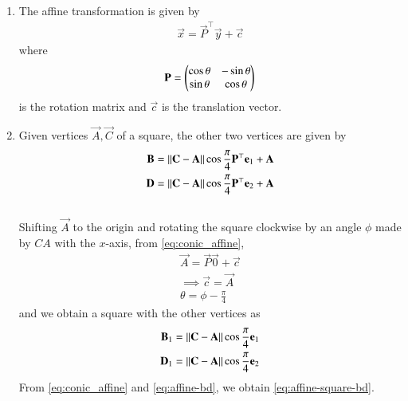 \begin{enumerate}[label=\thesubsection.\arabic*.,ref=\thesubsection.\theenumi]
	\item 
The affine transformation is given by 
\begin{align}
	\label{eq:conic_affine}
	\vec{x} = \vec{P}^{\top}\vec{y}+\vec{c}
\end{align}
where 
\begin{align}
\mathbf{P} =
\begin{pmatrix}
\cos\theta & -\sin\theta \\
\sin\theta & \cos\theta 
\end{pmatrix}
\end{align}
is the rotation matrix and $\vec{c}$ is the translation vector.
\item Given vertices $\vec{A}, \vec{C}$ of a square, the other two vertices are given by
\begin{align}
\begin{split}
	\mathbf{B} = \left\lVert\mathbf{C}-\mathbf{A}\right\rVert\cos \frac{\pi}{4}\mathbf{P}^{\top}\mathbf{e}_1+\mathbf{A}
	\\
	\mathbf{D} = \left\lVert\mathbf{C}-\mathbf{A}\right\rVert\cos \frac{\pi}{4}\mathbf{P}^{\top}\mathbf{e}_2+\mathbf{A}
\end{split}
	\label{eq:affine-square-bd}
\end{align}
	\\
		\solution Shifting $\vec{A}$ to the origin and rotating the square clockwise by an angle $\phi$ made by $CA$ with the $x$-axis,
	from \eqref{eq:conic_affine},
\begin{align}
\vec{A} = \vec{P}\vec{0}+\vec{c}
\\
\implies 
\vec{c} = \vec{A}
\\
	\theta =  \phi -\frac{\pi}{4} 
\end{align}
and we obtain a square with the other vertices as
\begin{align}
\begin{split}
	\mathbf{B}_1 = \left\lVert\mathbf{C}-\mathbf{A}\right\rVert\cos \frac{\pi}{4}\mathbf{e}_1
	\\
	\mathbf{D}_1 = \left\lVert\mathbf{C}-\mathbf{A}\right\rVert\cos \frac{\pi}{4}\mathbf{e}_2
\end{split}
	\label{eq:affine-bd}
\end{align}
	From \eqref{eq:conic_affine}
	and 
	\eqref{eq:affine-bd},
	we obtain \eqref{eq:affine-square-bd}.
\end{enumerate}
